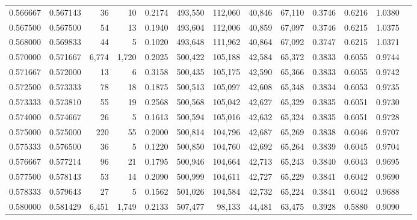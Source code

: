 \begin{tabular}{rrrrrrrrrrrrr}
0.566667 & 0.567143 &     36 &    10 &                                     0.2174 & 493,550 & 112,060 &  40,846 &  67,110 & 0.3746 & 0.6216 & 1.0380 \\
0.567500 & 0.567500 &     54 &    13 &                                     0.1940 & 493,604 & 112,006 &  40,859 &  67,097 & 0.3746 & 0.6215 & 1.0375 \\
0.568000 & 0.569833 &     44 &     5 &                                     0.1020 & 493,648 & 111,962 &  40,864 &  67,092 & 0.3747 & 0.6215 & 1.0371 \\
0.570000 & 0.571667 &  6,774 & 1,720 &                                     0.2025 & 500,422 & 105,188 &  42,584 &  65,372 & 0.3833 & 0.6055 & 0.9744 \\
0.571667 & 0.572000 &     13 &     6 &                                     0.3158 & 500,435 & 105,175 &  42,590 &  65,366 & 0.3833 & 0.6055 & 0.9742 \\
0.572500 & 0.573333 &     78 &    18 &                                     0.1875 & 500,513 & 105,097 &  42,608 &  65,348 & 0.3834 & 0.6053 & 0.9735 \\
0.573333 & 0.573810 &     55 &    19 &                                     0.2568 & 500,568 & 105,042 &  42,627 &  65,329 & 0.3835 & 0.6051 & 0.9730 \\
0.574000 & 0.574667 &     26 &     5 &                                     0.1613 & 500,594 & 105,016 &  42,632 &  65,324 & 0.3835 & 0.6051 & 0.9728 \\
0.575000 & 0.575000 &    220 &    55 &                                     0.2000 & 500,814 & 104,796 &  42,687 &  65,269 & 0.3838 & 0.6046 & 0.9707 \\
0.575333 & 0.576500 &     36 &     5 &                                     0.1220 & 500,850 & 104,760 &  42,692 &  65,264 & 0.3839 & 0.6045 & 0.9704 \\
0.576667 & 0.577214 &     96 &    21 &                                     0.1795 & 500,946 & 104,664 &  42,713 &  65,243 & 0.3840 & 0.6043 & 0.9695 \\
0.577500 & 0.578143 &     53 &    14 &                                     0.2090 & 500,999 & 104,611 &  42,727 &  65,229 & 0.3841 & 0.6042 & 0.9690 \\
0.578333 & 0.579643 &     27 &     5 &                                     0.1562 & 501,026 & 104,584 &  42,732 &  65,224 & 0.3841 & 0.6042 & 0.9688 \\
0.580000 & 0.581429 &  6,451 & 1,749 &                                     0.2133 & 507,477 &  98,133 &  44,481 &  63,475 & 0.3928 & 0.5880 & 0.9090 \\

\end{tabular}
